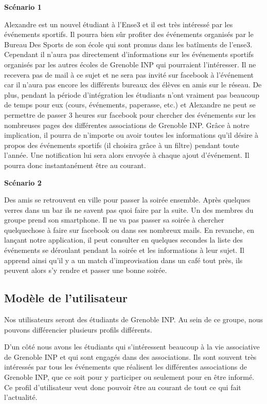 \documentclass[a4paper, 11px]{article}
\begin{document}
{\bf Scénario 1} 

Alexandre est un nouvel étudiant à l'Ense3 et il est très intéressé par les événements sportifs. Il pourra bien sûr profiter des événements organisés par
le Bureau Des Sports de son école qui sont promus dans les batîments de l'ense3. Cependant il n'aura pas directement d'informations sur les événements sportifs 
organisés par les autres écoles de Grenoble INP qui pourraient l'intéresser. Il ne recevera pas de mail à ce sujet et ne sera pas invité sur facebook
à l'événement car il n'aura pas encore les différents bureaux des élèves en amis sur le réseau. De plus, pendant la période d'intégration les étudiants n'ont vraiment pas beaucoup de temps pour eux (cours, événements, paperasse, etc.) et Alexandre ne peut se permettre de passer 3 heures sur facebook pour chercher des événements
sur les nombreuses pages des différentes associations de Grenoble INP. Grâce à notre implication, il pourra de n'importe ou avoir toutes les informations qu'il désire
à propos des événements sportifs (il choisira grâce à un filtre) pendant toute l'année. Une notification lui sera alors envoyée à chaque ajout d'événement. Il pourra donc
instantanément être au courant.

{\bf Scénario 2}

Des amis se retrouvent en ville pour passer la soirée ensemble. Après quelques verres dans un bar ils ne savent pas quoi faire par la suite. Un des membres du groupe
prend son smartphone. Il ne va pas passer sa soirée à chercher quelquechose à faire sur facebook ou dans ses nombreux mails. En revanche, en lançant notre application,
il peut consulter en quelques secondes la liste des événements se déroulant pendant la soirée et les informations à leur sujet. Il apprend ainsi qu'il y a un match d'improvisation dans un café tout près, ils peuvent alors s'y rendre et passer une bonne soirée.

\subsection{Modèle de l'utilisateur}

Nos utilisateurs seront des étudiants de Grenoble INP. Au sein de ce groupe, nous pouvons différencier plusieurs profils différents.

D'un côté nous avons les étudiants qui s'intéressent beaucoup à la vie associative de Grenoble INP et qui sont engagés dans des associations.
Ils sont souvent très intéressés par tous les événements que réalisent les différentes associations de Grenoble INP, que ce soit pour y participer ou seulement
pour en être informé. Ce profil d'utilisateur veut donc pouvoir être au courant de tout ce qui fait l'actualité.
\end{document}
